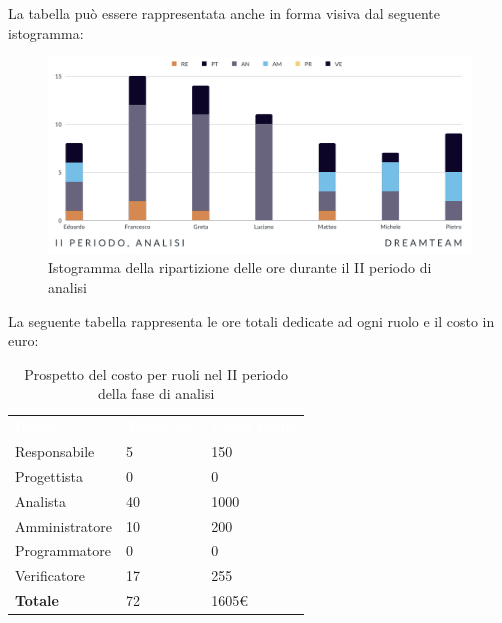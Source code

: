 La tabella può essere rappresentata anche in forma visiva dal seguente istogramma: 
\begin{figure}[H]
\centering
\includegraphics[scale=0.65]{Sezioni/SezioniPreventivo/grafici/Analisi_II_periodo.png}
\caption{Istogramma della ripartizione delle ore durante il II periodo di analisi}
\end{figure}

La seguente tabella rappresenta le ore totali dedicate ad ogni ruolo e il costo in euro:

\begin{table}[H]
\begin{center}
\renewcommand{\arraystretch}{1.5}
\begin{tabular}{ m{}<{\centering}  m{}<{\centering} m{}<{\centering}}
	\rowcolor{darkblue}
	\textcolor{white}{\textbf{Ruolo}}&\textcolor{white}{\textbf{Totale ore}}&\textcolor{white}{\textbf{Costo totale}}\\ 

	Responsabile  & 5 & 150 \\	
	
	Progettista & 0 &  0 \\
	
	Analista & 40 & 1000 \\

	Amministratore & 10 & 200\\
	
	Programmatore & 0 &  0\\
	
	Verificatore & 17 & 255\\
	
	\textbf{Totale} & 72 &  1605\euro \\
	
\end{tabular}
\caption{Prospetto del costo per ruoli nel II periodo della fase di analisi}
\end{center}
\end{table}

